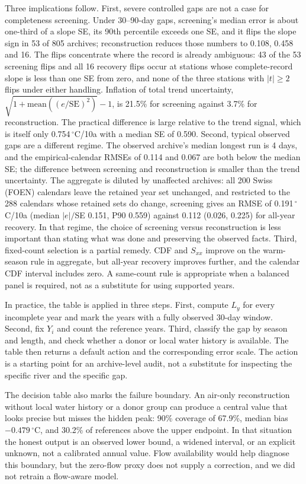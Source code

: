Three implications follow. First, severe controlled gaps are not a case for completeness screening. Under 30--90-day gaps, screening's median error is about one-third of a slope SE, its 90th percentile exceeds one SE, and it flips the slope sign in 53 of 805 archives; reconstruction reduces those numbers to 0.108, 0.458 and 16. The flips concentrate where the record is already ambiguous: 43 of the 53 screening flips and all 16 recovery flips occur at stations whose complete-record slope is less than one SE from zero, and none of the three stations with $|t|\ge 2$ flips under either handling. Inflation of total trend uncertainty, $\sqrt{1+\mathrm{mean}((e/\mathrm{SE})^2)}-1$, is 21.5\% for screening against 3.7\% for reconstruction. The practical difference is large relative to the trend signal, which is itself only 0.754\,$^{\circ}$C/10a with a median SE of 0.590. Second, typical observed gaps are a different regime. The observed archive's median longest run is 4 days, and the empirical-calendar RMSEs of 0.114 and 0.067 are both below the median SE; the difference between screening and reconstruction is smaller than the trend uncertainty. The aggregate is diluted by unaffected archives: all 200 Swiss (FOEN) calendars leave the retained year set unchanged, and restricted to the 288 calendars whose retained sets do change, screening gives an RMSE of 0.191\,$^{\circ}$C/10a (median $|e|/$SE 0.151, P90 0.559) against 0.112 (0.026, 0.225) for all-year recovery. In that regime, the choice of screening versus reconstruction is less important than stating what was done and preserving the observed facts. Third, fixed-count selection is a partial remedy. CDF and $S_{xx}$ improve on the warm-season rule in aggregate, but all-year recovery improves further, and the calendar CDF interval includes zero. A same-count rule is appropriate when a balanced panel is required, not as a substitute for using supported years.

In practice, the table is applied in three steps. First, compute $L_y$ for every incomplete year and mark the years with a fully observed 30-day window. Second, fix $Y_i$ and count the reference years. Third, classify the gap by season and length, and check whether a donor or local water history is available. The table then returns a default action and the corresponding error scale. The action is a starting point for an archive-level audit, not a substitute for inspecting the specific river and the specific gap.

The decision table also marks the failure boundary. An air-only reconstruction without local water history or a donor group can produce a central value that looks precise but misses the hidden peak: 90\% coverage of 67.9\%, median bias $-0.479$\,$^{\circ}$C, and 30.2\% of references above the upper endpoint. In that situation the honest output is an observed lower bound, a widened interval, or an explicit unknown, not a calibrated annual value. Flow availability would help diagnose this boundary, but the zero-flow proxy does not supply a correction, and we did not retrain a flow-aware model.

